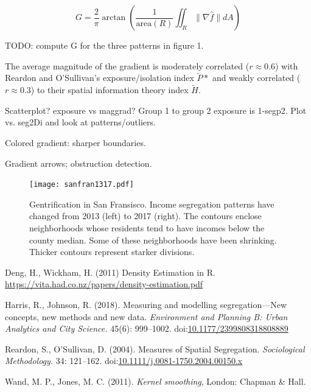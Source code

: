 \documentclass{article}
\theoremstyle{theorem}
\theoremstyle{definition}
\begin{document}
\begin{equation}
  G = \frac{2}{\pi} \arctan \left(\frac{1}{\mathrm{area}(R)} \iint_R \lVert \nabla \hat{f} \rVert dA \right)
\end{equation}

TODO: compute G for the three patterns in figure 1.

The average magnitude of the gradient is moderately correlated ($r \approx 0.6$) with Reardon and O'Sullivan's exposure/isolation index $\tilde{P}*$ and weakly correlated ($r\approx 0.3$) to their spatial information theory index $\tilde{H}$.

Scatterplot? exposure vs maggrad? Group 1 to group 2 exposure is 1-segp2. Plot vs. seg2Di and look at patterns/outliers.

Colored gradient: sharper boundaries.

Gradient arrows; obstruction detection.
\begin{figure}
  \texttt{[image: sanfran1317.pdf]}
  \caption{Gentrification in San Fransisco. Income segregation patterns have changed from 2013 (left) to 2017 (right). The contours enclose neighborhoods whose residents tend to have incomes below the county median. Some of these neighborhoods have been shrinking. Thicker contours represent starker divisions.}
  \label{fig:sanfran1317}
\end{figure}


\begin{thebibliography}{3}

 Deng, H., Wickham, H. (2011) Density Estimation in R. \href{https://vita.had.co.nz/papers/density-estimation.pdf}{\url{https://vita.had.co.nz/papers/density-estimation.pdf}}

Harris, R., Johnson, R. (2018). Measuring and modelling segregation---New concepts, new methods and new data. \textit{Environment and Planning B: Urban Analytics and City Science.} 45(6): 999--1002. doi:\href{http://dx.doi.org/10.1177/2399808318808889}{10.1177/2399808318808889}

Reardon, S., O'Sullivan, D. (2004). Measures of Spatial Segregation. \textit{Sociological Methodology.} 34: 121--162. doi:\href{http://dx.doi.org/10.1111/j.0081-1750.2004.00150.x}{10.1111/j.0081-1750.2004.00150.x}

 Wand, M. P., Jones, M. C. (2011). \textit{Kernel smoothing}, London: Chapman \& Hall.

\end{thebibliography}
\end{document}

